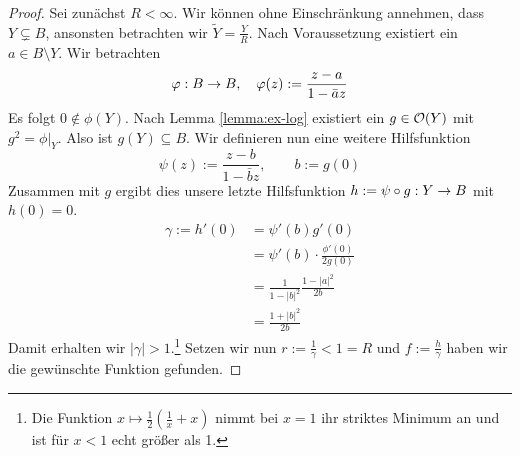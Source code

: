 \begin{proof}
  Sei zunächst $R < \infty$. Wir können ohne Einschränkung annehmen,
  dass $Y \subsetneq B$, ansonsten betrachten wir $\tilde Y =
  \frac{Y}{R}$. Nach Voraussetzung existiert ein $a \in B \setminus
  Y$. Wir betrachten
  \[
  \varphi: B \rightarrow B, \quad \varphi(z) := \frac{z-a}{1-\bar a z}
  \]
  Es folgt $0 \notin \phi(Y)$. Nach Lemma \ref{lemma:ex-log} existiert ein
  $g \in \mathcal{O}(Y)$ mit $g^2 = \phi|_Y$. Also ist $g(Y) \subseteq
  B$. Wir definieren nun eine weitere Hilfsfunktion
  \[
  \psi(z) := \frac{z-b}{1 - \bar b z}, \qquad b:= g(0)
  \]
  Zusammen mit $g$ ergibt dies unsere letzte Hilfsfunktion $h :=
  \psi \circ g: Y \rightarrow B$ mit $h(0) = 0$.
  \begin{align*}
    \gamma := h'(0) & = \psi'(b) g'(0) \\
    & = \psi'(b) \cdot \frac{\phi'(0)}{2 g(0)} \\
    & = \frac{1}{1-|b|^2} \frac{1-|a|^2}{2b} \\
    & = \frac{1 + |b|^2}{2b}
  \end{align*}
  Damit erhalten wir $|\gamma| > 1$.\footnote{Die Funktion $x \mapsto
    \frac12 \left ( \frac1x + x \right )$ nimmt bei $x = 1$ ihr
    striktes Minimum an und ist für $x< 1$ echt größer als 1.} Setzen
  wir nun $r := \frac{1}{\gamma} < 1 = R$ und $f :=
  \frac{h}{\gamma}$ haben wir die gewünschte Funktion gefunden.


\end{proof}
